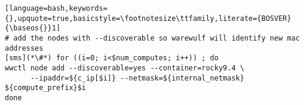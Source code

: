 \begin{lstlisting}[language=bash,keywords={},upquote=true,basicstyle=\footnotesize\ttfamily,literate={BOSVER}{\baseos{}}1]
# add the nodes with --discoverable so warewulf will identify new mac addresses
[sms](*\#*) for ((i=0; i<$num_computes; i++)) ; do
wwctl node add --discoverable=yes --container=rocky9.4 \
	  --ipaddr=${c_ip[$i]} --netmask=${internal_netmask} ${compute_prefix}$i
done
\end{lstlisting}
